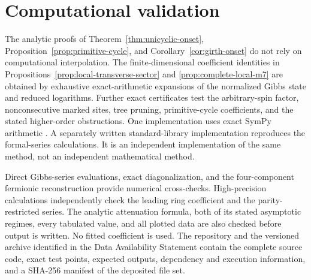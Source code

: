 \documentclass[11pt]{article}
\begin{document}
\section{Computational validation}
\label{app:reproducibility}

The analytic proofs of Theorem~\ref{thm:unicyclic-onset},
Proposition~\ref{prop:primitive-cycle}, and Corollary~\ref{cor:girth-onset} do
not rely on computational interpolation.  The finite-dimensional coefficient
identities in Propositions~\ref{prop:local-transverse-sector} and
\ref{prop:complete-local-m7} are obtained by exhaustive exact-arithmetic
expansions of the normalized Gibbs state and reduced logarithms.  Further
exact certificates test the arbitrary-spin factor, nonconsecutive marked
sites, tree pruning, primitive-cycle coefficients, and the stated
higher-order obstructions.  One implementation uses exact SymPy arithmetic
\cite{MeurerEtAl2017}.  A separately written standard-library implementation
reproduces the formal-series calculations.  It is an independent
implementation of the same method, not an independent mathematical method.

Direct Gibbs-series evaluations, exact diagonalization, and the four-component
fermionic reconstruction provide numerical cross-checks.  High-precision
calculations independently check the leading ring coefficient and the
parity-restricted series.  The analytic attenuation formula, both of its
stated asymptotic regimes, every tabulated value, and all plotted data are
also checked before output is written.  No fitted coefficient is used.  The
repository and the versioned archive identified in the Data Availability
Statement contain the complete source code, exact test points, expected
outputs, dependency and execution information, and a SHA-256 manifest of the
deposited file set.
\end{document}
